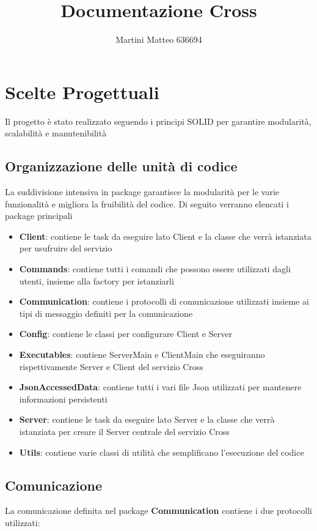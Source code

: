 \documentclass{article}
\title{Documentazione Cross}
\author{Martini Matteo 636694}
\begin{document}
\maketitle

\tableofcontents

\section{Scelte Progettuali}
Il progetto è stato realizzato seguendo i principi SOLID per garantire modularità, scalabilità e manutenibilità 
\subsection{Organizzazione delle unità di codice}
La suddivisione intensiva in package garantisce la modularità per le varie funzionalità e migliora la fruibilità del codice.
Di seguito verranno elencati i package principali
\begin{itemize}
    \item \textbf{Client}: contiene le task da eseguire lato Client e la classe che verrà istanziata per usufruire del servizio
    \item \textbf{Commands}: contiene tutti i comandi che possono essere utilizzati dagli utenti, insieme alla factory per istanziarli
    \item \textbf{Communication}: contiene i protocolli di comunicazione utilizzati insieme ai tipi di messaggio definiti per la comunicazione
    \item \textbf{Config}: contiene le classi per configurare Client e Server
    \item \textbf{Executables}: contiene ServerMain e ClientMain che eseguiranno rispettivamente Server e Client del servizio Cross
    \item \textbf{JsonAccessedData}: contiene tutti i vari file Json utilizzati per mantenere informazioni persistenti
    \item \textbf{Server}: contiene le task da eseguire lato Server e la classe che verrà istanziata per creare il Server centrale del servizio Cross
    \item \textbf{Utils}: contiene varie classi di utilità che semplificano l'esecuzione del codice
\end{itemize}

\subsection{Comunicazione}
La comunicazione definita nel package \textbf{Communication} contiene i due protocolli utilizzati:
\end{document}
